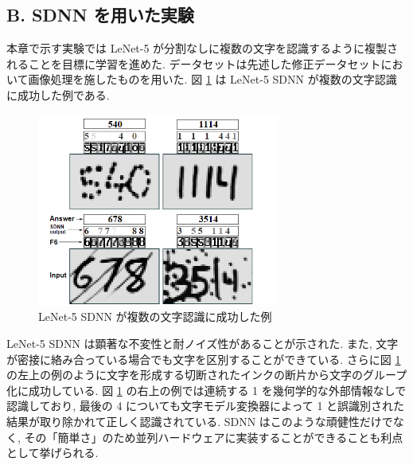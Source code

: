 \documentclass[twocolumn]{jarticle}     %
\begin{document}
\subsection*{B. SDNN を用いた実験}
本章で示す実験では LeNet-5 が分割なしに複数の文字を認識するように複製されることを目標に学習を進めた. データセットは先述した修正データセットにおいて画像処理を施したものを用いた.
図 \ref{fig:26} は LeNet-5 SDNN が複数の文字認識に成功した例である. 
\begin{figure}[t]
  \centering
  \includegraphics[width=80mm]{assets/26.png}
  \caption{ LeNet-5 SDNN が複数の文字認識に成功した例}
  \label{fig:26}
\end{figure}
LeNet-5 SDNN は顕著な不変性と耐ノイズ性があることが示された. 
また, 文字が密接に絡み合っている場合でも文字を区別することができている. さらに図 \ref{fig:26} の左上の例のように文字を形成する切断されたインクの断片から文字のグループ化に成功している.
図 \ref{fig:26} の右上の例では連続する 1 を幾何学的な外部情報なしで認識しており, 最後の 4 についても文字モデル変換器によって 1 と誤識別された結果が取り除かれて正しく認識されている. 
SDNN はこのような頑健性だけでなく, その「簡単さ」のため並列ハードウェアに実装することができることも利点として挙げられる.
\end{document}
